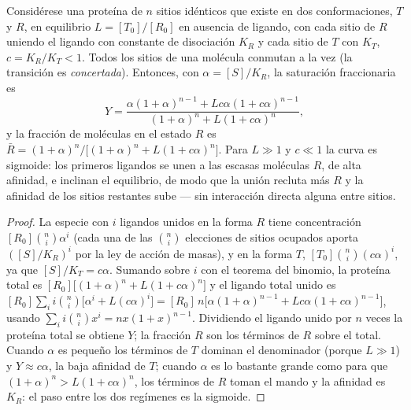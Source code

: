 \begin{theorem}\label{thm:b3:structural-biology:mwc}
Considérese una proteína de $n$ sitios idénticos que existe en dos
conformaciones, $T$ y $R$, en equilibrio $L = [T_{0}]/[R_{0}]$ en
ausencia de ligando, con cada sitio de $R$ uniendo el ligando con
constante de disociación $K_{R}$ y cada sitio de $T$ con $K_{T}$,
$c = K_{R}/K_{T} < 1$. Todos los sitios de una molécula conmutan a la vez
(la transición es \emph{concertada}). Entonces, con
$\alpha = [S]/K_{R}$, la saturación fraccionaria es
\[
Y = \frac{\alpha(1+\alpha)^{n-1} + Lc\alpha(1+c\alpha)^{n-1}}
{(1+\alpha)^{n} + L(1+c\alpha)^{n}},
\]
y la fracción de moléculas en el estado $R$ es $\bar R =
(1+\alpha)^{n}/\bigl[(1+\alpha)^{n} + L(1+c\alpha)^{n}\bigr]$. Para $L
\gg 1$ y $c \ll 1$ la curva es sigmoide: los primeros ligandos se unen a
las escasas moléculas $R$, de alta afinidad, e inclinan el equilibrio, de
modo que la unión recluta más $R$ y la afinidad de los sitios restantes
sube ---  sin interacción directa alguna entre sitios.
\end{theorem}
\begin{proof}
La especie con $i$ ligandos unidos en la forma $R$ tiene concentración
$[R_{0}]\binom{n}{i}\alpha^{i}$ (cada una de las $\binom{n}{i}$
elecciones de sitios ocupados aporta $([S]/K_{R})^{i}$ por la ley de
acción de masas), y en la forma $T$,
$[T_{0}]\binom{n}{i}(c\alpha)^{i}$, ya que $[S]/K_{T} = c\alpha$. Sumando
sobre $i$ con el teorema del binomio, la proteína total es
$[R_{0}]\bigl[(1+\alpha)^{n} + L(1+c\alpha)^{n}\bigr]$ y el ligando total
unido es $[R_{0}]\sum_{i} i\binom{n}{i}\bigl[
\alpha^{i} + L(c\alpha)^{i}\bigr] = [R_{0}]\,n\bigl[\alpha(1+\alpha)^{n-1}
+ Lc\alpha(1+c\alpha)^{n-1}\bigr]$, usando $\sum_{i} i\binom{n}{i}x^{i} =
nx(1+x)^{n-1}$. Dividiendo el ligando unido por $n$ veces la proteína
total se obtiene $Y$; la fracción $R$ son los términos de $R$ sobre el
total. Cuando $\alpha$ es pequeño los términos de $T$ dominan el
denominador (porque $L \gg 1$) y $Y \approx c\alpha$, la baja afinidad de
$T$; cuando $\alpha$ es lo bastante grande como para que
$(1+\alpha)^{n} > L(1+c\alpha)^{n}$, los términos de $R$ toman el mando y
la afinidad es $K_{R}$: el paso entre los dos regímenes es la sigmoide.
\end{proof}

